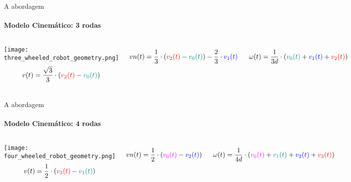 \begin{frame}[t]{A abordagem}
  \transboxout[duration=0.5]
  \framesubtitle{Modelo Cinemático: 3 rodas}
  \begin{columns}
    \texttt{[image: three\_wheeled\_robot\_geometry.png]}
      \begin{equation*}
        v(t) = 
        \frac{\sqrt{3}}{3} \cdot
        \left(
          {\color[rgb]{1,0,0} v_2(t)} - 
          {\color[rgb]{0,0.5,0.5} v_0(t)}
        \right)
      \end{equation*}

      \begin{equation*}
        vn(t) =
        \frac{1}{3} \cdot
        \left(
          {\color[rgb]{1,0,0} v_2(t)} -
          {\color[rgb]{0,0.5,0.5} v_0(t)}\right) - 
          \frac{2}{3} \cdot
          {\color[rgb]{0,0,1} v_1(t)}
      \end{equation*}

      \begin{equation*}
        \omega(t) =
        \frac{1}{3d}\cdot
        \left(
          {\color[rgb]{0,0.5,0.5} v_0(t)} +
          {\color[rgb]{0,0,1} v_1(t)} +
          {\color[rgb]{1,0,0} v_2(t)}
        \right)
      \end{equation*}
  \end{columns}
\end{frame}


\begin{frame}[t]{A abordagem}
  \transboxout[duration=0.5]
  \framesubtitle{Modelo Cinemático: 4 rodas}
  \begin{columns}
    \texttt{[image: four\_wheeled\_robot\_geometry.png]}
      \begin{equation*}
        v(t) = 
        \frac{1}{2} \cdot
        \left(
          {\color[rgb]{1,0,0} v_3(t)} - 
          {\color[rgb]{0,0.5,0.5} v_1(t)}
        \right)
      \end{equation*}

      \begin{equation*}
        vn(t) = 
        \frac{1}{2} \cdot
        \left(
          {\color[rgb]{1,0,1} v_0(t)} - 
          {\color[rgb]{0,0,1} v_2(t)}
        \right)
      \end{equation*}

      \begin{equation*}
        \omega(t) =
        \frac{1}{4d}\cdot
        \left(
          {\color[rgb]{1,0,1} v_0(t)} + 
          {\color[rgb]{0,0.5,0.5} v_1(t)} +
          {\color[rgb]{0,0,1} v_2(t)} +
          {\color[rgb]{1,0,0} v_3(t)} 
        \right)
      \end{equation*}
  \end{columns}
\end{frame}


